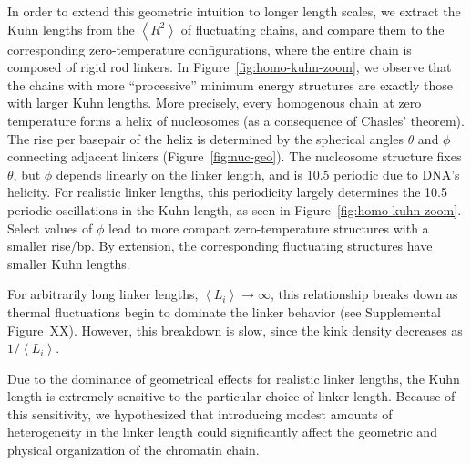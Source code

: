 \documentclass[%
 reprint,
superscriptaddress,
showpacs,preprintnumbers,
 amsmath,amssymb,
 aps,
 prl,
]{revtex4-1}
\newcommand{\RR}{\left\langle{}R^2\right\rangle{}}
\newcommand{\meanli}{\left\langle{}L_i\right\rangle}
\begin{document}
In order to extend this geometric intuition to longer length scales, we extract
the Kuhn lengths from the $\RR$ of fluctuating chains, and compare them to
    the corresponding  zero-temperature configurations, where the entire chain is
    composed of rigid rod linkers.
In Figure~\ref{fig:homo-kuhn-zoom},%
we observe that the chains with more ``processive'' minimum energy structures
    are exactly those with larger Kuhn lengths.
More precisely, every homogenous chain at zero temperature forms a
    helix of nucleosomes (as a consequence of Chasles' theorem).
The rise per basepair of the helix is determined by the spherical angles
    $\theta$ and $\phi$ connecting adjacent linkers (Figure~\ref{fig:nuc-geo}).
The nucleosome structure fixes $\theta$, but $\phi$ depends linearly on the
    linker length, and is \SI{10.5}{\basepair} periodic due to DNA's helicity.
For realistic linker lengths, this periodicity largely determines the
\SI{10.5}{\basepair} periodic oscillations in the Kuhn
length, as seen in Figure~\ref{fig:homo-kuhn-zoom}.
Select values of $\phi$ lead to more compact zero-temperature structures with a
smaller rise/bp. By extension, the corresponding fluctuating structures have smaller Kuhn
lengths.

For arbitrarily long linker lengths, $\meanli\to\infty$, this relationship breaks
    down as thermal fluctuations begin to dominate the linker behavior (see
    Supplemental Figure~XX).%
However, this breakdown is slow, since the kink density decreases as $1/\meanli$.

Due to the dominance of geometrical effects for realistic linker lengths, the
Kuhn length is extremely  sensitive to the particular choice of linker length.
Because of this sensitivity, we hypothesized that introducing modest amounts of
    heterogeneity in the linker length could significantly affect the geometric
    and physical organization of the chromatin chain.
\end{document}
